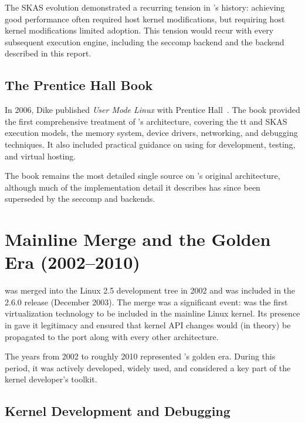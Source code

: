 The SKAS evolution demonstrated a recurring tension in \UML{}'s history:
achieving good performance often required host kernel modifications, but
requiring host kernel modifications limited adoption.  This tension would
recur with every subsequent execution engine, including the seccomp backend
and the \KVMvTwo{} backend described in this report.

\subsection{The Prentice Hall Book}
\label{sec:history-book}

In 2006, Dike published \emph{User Mode Linux} with Prentice
Hall~\cite{dike2006book}.  The book provided the first comprehensive treatment
of \UML{}'s architecture, covering the tt and SKAS execution models, the memory
system, device drivers, networking, and debugging techniques.  It also included
practical guidance on using \UML{} for development, testing, and virtual
hosting.

The book remains the most detailed single source on \UML{}'s original
architecture, although much of the implementation detail it describes has
since been superseded by the seccomp and \KVMvTwo{} backends.

\section{Mainline Merge and the Golden Era (2002--2010)}
\label{sec:history-golden}

\UML{} was merged into the Linux 2.5 development tree in 2002 and was
included in the 2.6.0 release (December 2003).  The merge was a significant
event: \UML{} was the first virtualization technology to be included in the
mainline Linux kernel.  Its presence in  gave it
legitimacy and ensured that kernel API changes would (in theory) be
propagated to the \UML{} port along with every other architecture.

The years from 2002 to roughly 2010 represented \UML{}'s golden era.  During
this period, it was actively developed, widely used, and considered a key
part of the kernel developer's toolkit.

\subsection{Kernel Development and Debugging}
\label{sec:history-kernel-dev}

